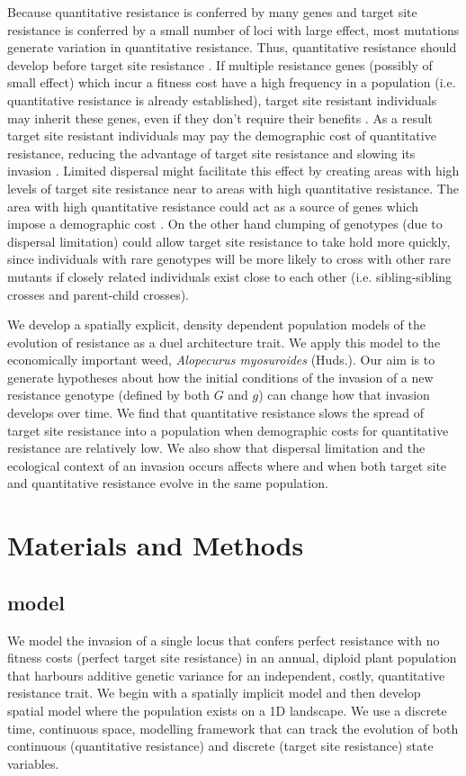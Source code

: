 \documentclass[10pt,letterpaper]{article}
\begin{document}
Because quantitative resistance is conferred by many genes \cite{petit2010, Busi2013} and target site resistance is conferred by a small number of loci with large effect, most mutations generate variation in quantitative resistance. Thus, quantitative resistance should develop before target site resistance \cite{Dely2010newPhy}. If multiple resistance genes (possibly of small effect) which incur a fitness cost have a high frequency in a population (i.e. quantitative resistance is already established), target site resistant individuals may inherit these genes, even if they don't require their benefits \cite{Yeam2015}. As a result target site resistant individuals may pay the demographic cost of quantitative resistance, reducing the advantage of target site resistance and slowing its invasion \cite{Chev2008}. Limited dispersal might facilitate this effect by creating areas with high levels of target site resistance near to areas with high quantitative resistance. The area with high quantitative resistance could act as a source of genes which impose a demographic cost \cite{Dely2010, Yeam2015}. On the other hand clumping of genotypes (due to dispersal limitation) could allow target site resistance to take hold more quickly, since individuals with rare genotypes will be more likely to cross with other rare mutants if closely related individuals exist close to each other (i.e. sibling-sibling crosses and parent-child crosses).

We develop a spatially explicit, density dependent population models of the evolution of resistance as a duel architecture trait. We apply this model to the economically important weed, \textit{Alopecurus myosuroides} (Huds.). Our aim is to generate hypotheses about how the initial conditions of the invasion of a new resistance genotype (defined by both $G$ and $g$) can change how that invasion develops over time. We find that quantitative resistance slows the spread of target site resistance into a population when demographic costs for quantitative resistance are relatively low. We also show that dispersal limitation and the ecological context of an invasion occurs affects where and when both target site and quantitative resistance evolve in the same population. 

\section*{Materials and Methods}
\subsection*{model}
We model the invasion of a single locus that confers perfect resistance with no fitness costs (perfect target site resistance) in an annual, diploid plant population that harbours additive genetic variance for an independent, costly, quantitative resistance trait. We begin with a spatially implicit model and then develop spatial model where the population exists on a 1D landscape. We use a discrete time, continuous space, modelling framework that can track the evolution of both continuous (quantitative resistance) and discrete (target site resistance) state variables.     
\end{document}
